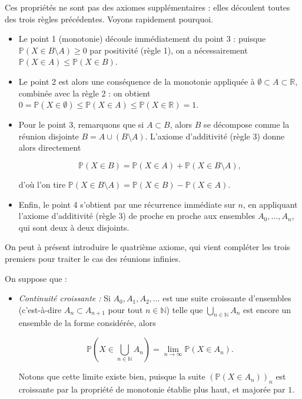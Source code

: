 \begin{remarque}
Ces propriétés ne sont pas des axiomes supplémentaires : elles découlent toutes des trois règles précédentes. Voyons rapidement pourquoi.

\begin{itemize}
\item Le point 1 (monotonie) découle immédiatement du point 3 : puisque $\mathbb{P}(X \in B \setminus A) \geq 0$ par positivité (règle 1), on a nécessairement $\mathbb{P}(X \in A) \leq \mathbb{P}(X \in B)$.
\item Le point 2 est alors une conséquence de la monotonie appliquée à $\emptyset \subset A \subset \mathbb{R}$, combinée avec la règle 2 : on obtient $0 = \mathbb{P}(X \in \emptyset) \leq \mathbb{P}(X \in A) \leq \mathbb{P}(X \in \mathbb{R}) = 1$.
\item Pour le point 3, remarquons que si $A \subset B$, alors $B$ se décompose comme la réunion disjointe $B = A \cup (B \setminus A)$. L'axiome d'additivité (règle 3) donne alors directement

$$
\mathbb{P}(X \in B) = \mathbb{P}(X \in A) + \mathbb{P}(X \in B \setminus A),
$$

d'où l'on tire $\mathbb{P}(X \in B \setminus A) = \mathbb{P}(X \in B) - \mathbb{P}(X \in A)$.
\item Enfin, le point 4 s'obtient par une récurrence immédiate sur $n$, en appliquant l'axiome d'additivité (règle 3) de proche en proche aux ensembles $A_0, \dots, A_n$, qui sont deux à deux disjoints.
\end{itemize}
\end{remarque}

On peut à présent introduire le quatrième axiome, qui vient compléter les trois premiers pour traiter le cas des réunions infinies.

\medskip

\begin{mdframed}
\begin{definition}
On suppose que :

\begin{itemize}
\item[$\boxed{4.}$] \textit{Continuité croissante : } Si $A_0, A_1, A_2, \dots$ est une suite croissante d'ensembles (c'est-à-dire $A_n \subset A_{n+1}$ pour tout $n \in \mathbb{N}$) telle que $\bigcup_{n \in \mathbb{N}} A_n$ est encore un ensemble de la forme considérée, alors

$$
\mathbb{P}\left(X \in \bigcup_{n \in \mathbb{N}} A_n\right) = \lim_{n \to \infty} \mathbb{P}(X \in A_n).
$$

Notons que cette limite existe bien, puisque la suite $\left(\mathbb{P}(X \in A_n)\right)_{n}$ est croissante par la propriété de monotonie établie plus haut, et majorée par $1$.
\end{itemize}
\end{definition}
\end{mdframed}

